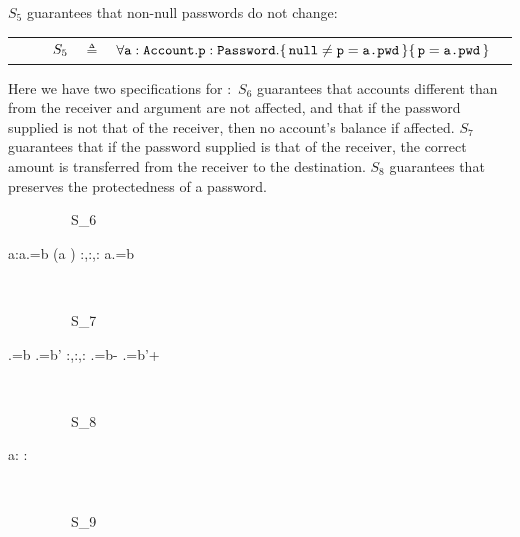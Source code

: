 {
 \begin{example}
 \label{example:twostate}
 $S_5$  guarantees   that   non-null passwords do not change:
 \\
 \begin{tabular}{lcll}
$\strut \ \ \ \ \ \ \ \ S_5$ & $\triangleq$   & ${\forall {\mbox{\normalfont{\texttt{a}}}:\mbox{\normalfont{\texttt{Account}}}.\mbox{\normalfont{\texttt{p}}}:\mbox{\normalfont{\texttt{Password}}}}.\{\, \mbox{\normalfont{\texttt{null}}}\neq \mbox{\normalfont{\texttt{p}}}=\mbox{\normalfont{\texttt{a.\mbox{\normalfont{\texttt{pwd}}}}}} \,\}\{\, \mbox{\normalfont{\texttt{p}}}=\mbox{\normalfont{\texttt{a.\mbox{\normalfont{\texttt{pwd}}}}}} \,\} }$
 \end{tabular}
 \end{example} 
 }
 
{ \begin{example}
 \label{example:mprepostl}
Here we have two specifications for :\ $S_6$   guarantees that
accounts different than from the receiver and argument are not affected, and that if the password supplied is not that of the receiver, then no account's balance if affected.
$S_7$ guarantees that if the password supplied is that of the receiver, the correct amount is transferred from the receiver to the destination.
 $S_8$ guarantees that  preserves the protectedness of a password.
\\
{\sprepost
		{\strut \ \ \ \ \ \ \ \ \ S_6} 
		{ a:\wedge  \wedge a.\prg{\balance}=b \wedge
		(\neq a\neq{} \vee {}\neq{})}
	               {} {} {:,:,:}
		{ a.\prg{\balance}=b}
}
\\
{\sprepost
		{\strut \ \ \ \ \ \ \ \ \ S_7} 
		{ %
		\neq {}\wedge {}.\prg{\balance}=b \wedge  {}.\prg{\balance}=b' }
		  {} {} {:,:,:}
		{.\prg{\balance}=b- \wedge {}.\prg{\balance}=b'+}
}
\\
{\sprepost
		{\strut \ \ \ \ \ \ \ \ \ S_8} 
		{  a:\wedge
		 }
		{} {} {:}
		{ }
}
\\
{\sprepost
		{\strut \ \ \ \ \ \ \ \ \ S_9} 
}
\end{example}}
